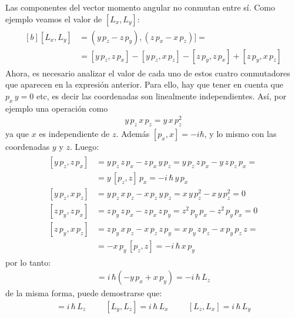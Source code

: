 Las componentes del vector momento angular no conmutan entre sí. Como ejemplo veamos el valor de $[L_{x}, L_{y}]$:
\begin{align}
\begin{aligned}[b]
[L_{x} , L_{y}] &= (y \, p_{z} - z \, p_{y}), (z \, p_{x} - x \, p_{z})] = \\[0.5em]
&= [y \, p_{z} , z \, p_{x}] - [y \, p_{z}, x \, p_{z}] -  [z \, p_{y}, z \, p_{x}] + [z \, p_{y}, x \, p_{z}]
\end{aligned}
\label{eq:ecuacion_05_09}
\end{align}
Ahora, es necesario analizar el valor de cada uno de estos cuatro conmutadores que aparecen en la expresión anterior. Para ello, hay que tener en cuenta que $p_{x} \, y = 0$ etc, es decir las coordenadas son linealmente independientes. Así, por ejemplo una operación como
\begin{align*}
y \, p_{z} \, x \, p_{z} = y \, x \, p_{z}^{2}
\end{align*}
ya que $x$ es independiente de $z$. Además $[p_{x}, x] = - i \hbar$, y lo mismo con las coordenadas $y$ y $z$. Luego:
\begin{align}
\begin{aligned}
[y \, p_{z}, z \, p_{x}] &= y \, p_{z} \, z \, p_{x} - z \, p_{x} \, y \, p_{z} = y \, p_{z} \, z \, p_{x} - y \, z \, p_{z} \, p_{x} = \\[0.5em]
&= y \, [p_{z}, z] \, p_{x} = -i \, \hbar \, y \, p_{x} \\[0.5em]
[y \, p_{z}, x \, p_{z}] &= y \, p_{z} \, x \, p_{z} - x \, p_{z} \, y \, p_{z} = x \, y \, p_{z}^{2} - x \, y \, p_{z}^{2} = 0 \\[0.5em]
[z \, p_{y}, z \, p_{x}] &= z \, p_{y} \, z \, p_{x} - z \, p_{x} \, z \, p_{y} = z^{2} \, p_{y} \, p_{x} - z^{2} \, p_{y} \, p_{x} = 0 \\[0.5em]
[z \, p_{y}, x \, p_{z}] &= z \, p_{y} \, x \, p_{z} - x \, p_{z} \, z \, p_{y} = x \, p_{y} \, z \, p_{z} - x \, p_{y} \, p_{z} \, z = \\[0.5em]
&= - x \, p_{y} \, [p_{z}, z] = -i \, \hbar \, x \, p_{y}
\end{aligned}
\label{eq:ecuacion_05_10}
\end{align}
por lo tanto:
\begin{align}
[L_{x}, L_{y}] = i \, \hbar (- y \, p_{x} + x \, p_{y}) = - i \, \hbar \, L_{z}
\label{eq:ecuacion_05_11}
\end{align}
de la misma forma, puede demostrarse que:
\begin{align}
[L_{x}, L_{y}] = i \, \hbar \, L_{z} \hspace{1cm} [L_{y}, L_{z}] = i \, \hbar \, L_{x} \hspace{1cm} [L_{z}, L_{x}] = i \, \hbar \, L_{y}
\label{eq:ecuacion_05_12}
\end{align}
